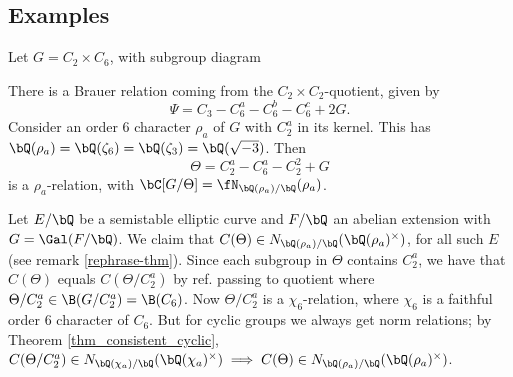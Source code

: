 \newpage
\subsection{Examples}

\begin{example}
    Let $G = C_2 \times C_6$, with subgroup diagram
    \begin{figure}[H]
        \centering
    \end{figure}
    There is a Brauer relation coming from the $C_2 \times C_2$-quotient, given by $$\Psi = C_3 - C_6^a - C_6^b - C_6^c + 2G.$$ Consider an order $6$ character $\rho_a$ of $G$ with $C_2^{a}$ in its kernel. This has $\bQ(\rho_a) = \bQ(\zeta_6) = \bQ(\zeta_3) = \bQ(\sqrt{-3})$. Then $$\Theta = C_2^{a} - C_6^{a} - C_2^{2} + G$$ is a $\rho_a$-relation, with $\bC[ G / \Theta] = \repnorm{\rho_a}$. 

    Let $E / \bQ$ be a semistable elliptic curve and $F / \bQ$ an abelian extension with $G = \Gal(F / \bQ)$. We claim that $C(\Theta) \in \fieldnorm{\rho_a}$, for all such $E$ (see remark \ref{rephrase-thm}). Since each subgroup in $\Theta$ contains $C_2^{a}$, we have that $C(\Theta)$ equals $C(\Theta / C_2^{a})$ {\color{red} by ref. passing to quotient} where $\Theta / C_2^{a} \in \B(G / C_2^{a}) = \B(C_6)$.  Now $\Theta / C_2^{a}$ is a $\chi_6$-relation, where $\chi_6$ is a faithful order $6$ character of $C_6$. But for cyclic groups we always get norm relations; by Theorem \ref{thm_consistent_cyclic}, $C(\Theta / C_2^{a}) \in \fieldnorm{\chi_a} \implies C(\Theta) \in \fieldnorm{\rho_a}$.


\end{example}
